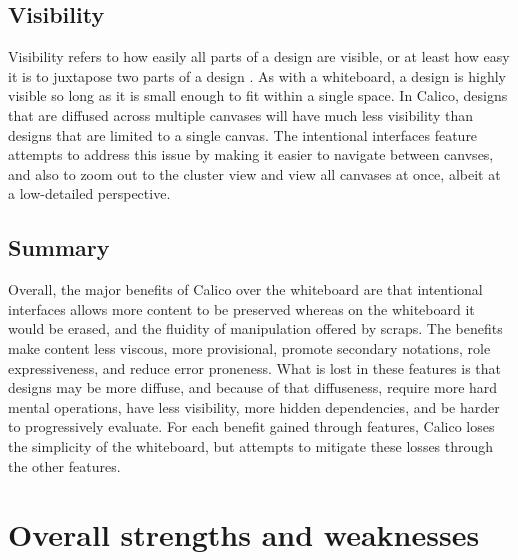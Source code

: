 \documentclass[12pt,fleqn]{ucithesis}
\begin{document}
\subsection{Visibility}

Visibility refers to how easily all parts of a design are visible, or at least how easy it is to juxtapose two parts of a design \cite{Petre2013BookChapter}. As with a whiteboard, a design is highly visible so long as it is small enough to fit within a single space. In Calico, designs that are diffused across multiple canvases will have much less visibility than designs that are limited to a single canvas. The intentional interfaces feature attempts to address this issue by making it easier to navigate between canvses, and also to zoom out to the cluster view and view all canvases at once, albeit at a low-detailed perspective.


\subsection{Summary}

Overall, the major benefits of Calico over the whiteboard are that intentional interfaces allows more content to be preserved whereas on the whiteboard it would be erased, and the fluidity of manipulation offered by scraps. The benefits make content less viscous, more provisional, promote secondary notations, role expressiveness, and reduce error proneness. What is lost in these features is that designs may be more diffuse, and because of that diffuseness, require more hard mental operations, have less visibility, more hidden dependencies, and be harder to progressively evaluate. For each benefit gained through features, Calico loses the simplicity of the whiteboard, but attempts to mitigate these losses through the other features.

\section{Overall strengths and weaknesses}
\label{discussion:overall-strengths-weaknesses}
\end{document}
